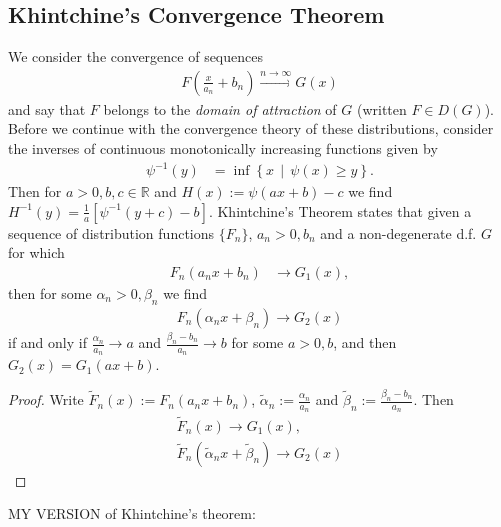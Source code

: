 \documentclass[english, parskip=full]{scrartcl}
\newcommand{\kla}{}
\newcommand{\klammer}{}
\begin{document}
\subsection{Khintchine's Convergence Theorem}
We consider the convergence of sequences
\begin{align}
F\kla\left( \frac{x}{a_n} + b_n \right) \overset{n\rightarrow \infty}{\longrightarrow} G(x)
\end{align}
and say that $F$ belongs to the \emph{domain of attraction} of $G$ (written $F\in D(G)$).
Before we continue with the convergence theory of these distributions, consider the inverses of continuous monotonically increasing functions given by
\begin{align}
\psi^{-1}(y) &= \inf \klammer\left\{ x \,\middle\vert\, \psi(x) \ge y \right\}.
\end{align}
Then for $a>0,b,c\in\mathbb{R}$ and $H(x) := \psi(ax+b) - c$ we find $H^{-1}(y) = \frac{1}{a} [\psi^{-1}(y+c) - b]$.
Khintchine's Theorem states that given a sequence of distribution functions $\{F_n\}$, $a_n>0,b_n$ and a non-degenerate d.f. $G$ for which
\begin{align}
F_n(a_nx+b_n)&\rightarrow G_1(x),
\end{align}
then for some $\alpha_n>0,\beta_n$ we find 
\begin{align}
F_n(\alpha_n x+ \beta_n) \rightarrow G_2(x)
\end{align}
if and only if $\frac{\alpha_n}{a_n} \rightarrow a$ and $\frac{\beta_n - b_n}{a_n} \rightarrow b$ for some $a>0,b$, and then $G_2(x) = G_1(ax+b)$.
\begin{proof}
Write $\tilde{F}_n(x) := F_n(a_nx + b_n)$, $\tilde{\alpha}_n := \frac{\alpha_n}{a_n}$ and $\tilde{\beta}_n := \frac{\beta_n - b_n}{a_n}$.
Then
\begin{align}
\tilde{F}_n(x) \rightarrow G_1(x),\\
\tilde{F}_n(\tilde{\alpha}_nx + \tilde{\beta}_n) \rightarrow G_2(x)
\end{align}
\end{proof}
MY VERSION of Khintchine's theorem:
\end{document}

